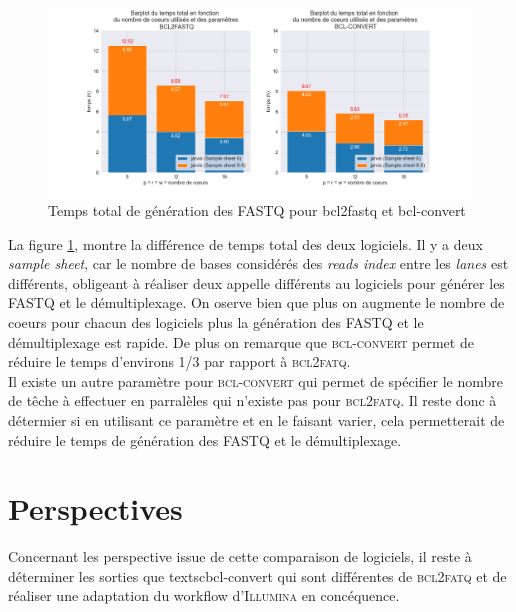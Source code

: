 \begin{figure}[H]
    \centering
    \includegraphics[width=1\textwidth]{img/barplot_total_time_comp.png}
    \caption{Temps total de génération des FASTQ pour bcl2fastq et bcl-convert}
    \label{fig-total-time}
\end{figure} 

La figure \ref{fig-total-time}, montre la différence de temps total des deux logiciels. Il y a deux \emph{sample sheet}, car le nombre de bases considérés des \emph{reads index} entre les \emph{lanes} est différents, obligeant à réaliser deux appelle différents au logiciels pour générer les \textsc{FASTQ} et le démultiplexage. 
On oserve bien que plus on augmente le nombre de coeurs pour chacun des logiciels plus la génération des \textsc{FASTQ} et le démultiplexage est rapide. De plus on remarque que \textsc{bcl-convert} permet de réduire le temps d'environs 1/3 par rapport à \textsc{bcl2fatq}.\\

Il existe un autre paramètre pour \textsc{bcl-convert} qui permet de spécifier le nombre de têche à effectuer en parralèles qui n'existe pas pour \textsc{bcl2fatq}. Il reste donc à détermier si en utilisant ce paramètre et en le faisant varier, cela permetterait de réduire le temps de génération des \textsc{FASTQ} et le démultiplexage. 
\section{Perspectives}
Concernant les perspective issue de cette comparaison de logiciels, il reste à déterminer les sorties que textsc{bcl-convert} qui sont différentes de \textsc{bcl2fatq} et de réaliser une adaptation du workflow d'\textsc{Illumina} en concéquence. \\


